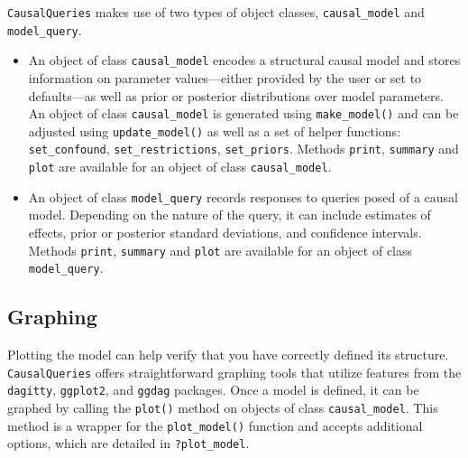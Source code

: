 \documentclass[
  11pt,
  article]{jss}
\begin{document}
\begin{tcolorbox}[enhanced jigsaw, toprule=.15mm, colbacktitle=quarto-callout-note-color!10!white, left=2mm, colframe=quarto-callout-note-color-frame, colback=white, coltitle=black, opacityback=0, bottomtitle=1mm, arc=.35mm, titlerule=0mm, breakable, opacitybacktitle=0.6, rightrule=.15mm, toptitle=1mm, leftrule=.75mm, title={Box 1: Classes and Methods}, bottomrule=.15mm]

\texttt{CausalQueries} makes use of two types of object classes,
\texttt{causal\_model} and \texttt{model\_query}.

\begin{itemize}
\item
  An object of class \texttt{causal\_model} encodes a structural causal
  model and stores information on parameter values---either provided by
  the user or set to defaults---as well as prior or posterior
  distributions over model parameters. An object of class
  \texttt{causal\_model} is generated using \texttt{make\_model()} and
  can be adjusted using \texttt{update\_model()} as well as a set of
  helper functions: \texttt{set\_confound}, \texttt{set\_restrictions},
  \texttt{set\_priors}. Methods \texttt{print}, \texttt{summary} and
  \texttt{plot} are available for an object of class
  \texttt{causal\_model}.
\item
  An object of class \texttt{model\_query} records responses to queries
  posed of a causal model. Depending on the nature of the query, it can
  include estimates of effects, prior or posterior standard deviations,
  and confidence intervals. Methods \texttt{print}, \texttt{summary} and
  \texttt{plot} are available for an object of class
  \texttt{model\_query}.
\end{itemize}

\end{tcolorbox}

\subsection{Graphing}\label{graphing}

Plotting the model can help verify that you have correctly defined its
structure. \texttt{CausalQueries} offers straightforward graphing tools
that utilize features from the \texttt{dagitty}, \texttt{ggplot2}, and
\texttt{ggdag} packages. Once a model is defined, it can be graphed by
calling the \texttt{plot()} method on objects of class
\texttt{causal\_model}. This method is a wrapper for the
\texttt{plot\_model()} function and accepts additional options, which
are detailed in \texttt{?plot\_model}.
\end{document}
